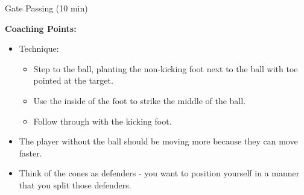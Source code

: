 \begin{oddBlock}{Gate Passing (10 min)}
\begin{minipage}[t]{\linewidth}
\begin{minipage}{.6\linewidth}
        \textbf{Coaching Points:}
        \begin{itemize}
        \setlength{\itemsep}{0pt}
        \setlength{\parskip}{0pt}
        \setlength{\parsep}{0pt}
        \item Technique:
        \begin{itemize}
            \setlength{\itemsep}{0pt}
            \setlength{\parskip}{0pt}
            \setlength{\parsep}{0pt}
            \item Step to the ball, planting the non-kicking foot next to the ball with toe pointed at the target.
            \item Use the inside of the foot to strike the middle of the ball.
            \item Follow through with the kicking foot.
        \end{itemize}
        \item The player without the ball should be moving more because they can move faster.
        \item Think of the cones as defenders - you want to position yourself in a manner that you split those defenders.
        \end{itemize}

    \end{minipage}
\end{minipage}

\end{oddBlock}